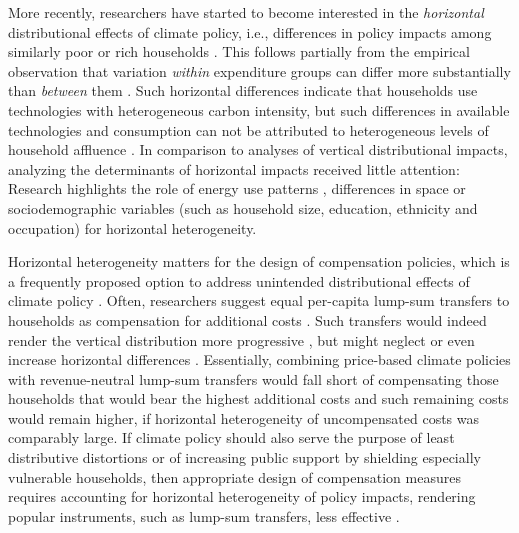 \documentclass[12pt, a4paper]{article}
\begin{document}
More recently, researchers have started to become interested in the \textit{horizontal} distributional effects of climate policy, i.e., differences in policy impacts among similarly poor or rich households \autocite{Rausch.2011,Fischer.2019}. This follows partially from the empirical observation that variation \textit{within} expenditure groups can differ more substantially than \textit{between} them \autocite{Cronin.2019,Steckel.2021b,Pizer.2019}. Such horizontal differences indicate that households use technologies with heterogeneous carbon intensity, but such differences in available technologies and consumption can not be attributed to heterogeneous levels of household affluence \autocite{Hansel.2022}. In comparison to analyses of vertical distributional impacts, analyzing the determinants of horizontal impacts received little attention: Research highlights the role of energy use patterns \autocite{Steckel.2021b,Missbach.2024}, differences in space \autocite{Chan.2023,Burtraw.2009} or sociodemographic variables (such as household size, education, ethnicity and occupation) \autocite{Grainger.2010,Buchs.2013,Farrell.2017,Missbach.2023,Fremstad.2019} for horizontal heterogeneity.

Horizontal heterogeneity matters for the design of compensation policies, which is a frequently proposed option to address unintended distributional effects of climate policy \autocite{Klenert.2018,Baranzini.2017}. Often, researchers suggest equal per-capita lump-sum transfers to households as compensation for additional costs \autocite{Stiglitz.2017,Baranzini.2000,Metcalf.2009}. Such transfers would indeed render the vertical distribution more progressive \autocite{Budolfson.2021,vanderPloeg.2022}, but might neglect or even increase horizontal differences \autocite{Cronin.2019,Hansel.2022}. Essentially, combining price-based climate policies with revenue-neutral lump-sum transfers would fall short of compensating those households that would bear the highest additional costs and such remaining costs would remain higher, if horizontal heterogeneity of uncompensated costs was comparably large. If climate policy should also serve the purpose of least distributive distortions \autocite{Fischer.2019} or of increasing public support by shielding especially vulnerable households, then appropriate design of compensation measures requires accounting for horizontal heterogeneity of policy impacts, rendering popular instruments, such as lump-sum transfers, less effective \autocite{Fullerton.2019,Missbach.2024}. 
\end{document}
